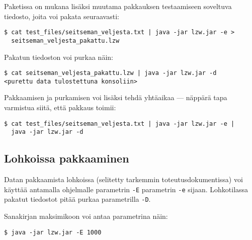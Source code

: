 \documentclass{article}
\begin{document}
Paketissa on mukana lisäksi muutama pakkauksen testaamiseen soveltuva tiedosto, joita voi pakata seuraavasti:
\begin{verbatim}
$ cat test_files/seitseman_veljesta.txt | java -jar lzw.jar -e >
  seitseman_veljesta_pakattu.lzw
\end{verbatim}

Pakatun tiedoston voi purkaa näin:
\begin{verbatim}
$ cat seitseman_veljesta_pakattu.lzw | java -jar lzw.jar -d
<purettu data tulostettuna konsoliin>
\end{verbatim}

Pakkaamisen ja purkamisen voi lisäksi tehdä yhtäaikaa --- näppärä tapa varmistua siitä, että pakkaus toimii:
\begin{verbatim}
$ cat test_files/seitseman_veljesta.txt | java -jar lzw.jar -e |
  java -jar lzw.jar -d
\end{verbatim}

\subsection{Lohkoissa pakkaaminen}
Datan pakkaamista lohkoissa (selitetty tarkemmin toteutusdokumentissa) voi käyttää antamalla ohjelmalle parametrin \verb+-E+ parametrin \verb+-e+ sijaan. Lohkotilassa pakatut tiedostot pitää purkaa parametrilla \verb+-D+.

Sanakirjan maksimikoon voi antaa parametrina näin:
\begin{verbatim}
$ java -jar lzw.jar -E 1000
\end{verbatim}
\end{document}
